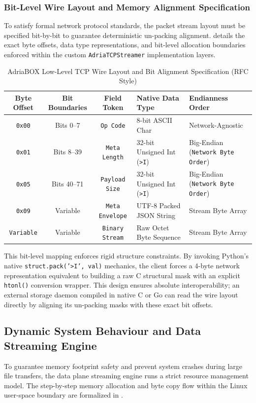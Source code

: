 \subsubsection{Bit-Level Wire Layout and Memory Alignment Specification}
To satisfy formal network protocol standards, the packet stream layout must be specified bit-by-bit to guarantee deterministic un-packing alignment.  details the exact byte offsets, data type representations, and bit-level allocation boundaries enforced within the custom \texttt{AdriaTCPStreamer} implementation layers.

\begin{table}[htbp]
\small
\centering
\caption{AdriaBOX Low-Level TCP Wire Layout and Bit Alignment Specification (RFC Style)}
\label{tab:rfc_wire_format}
\vspace{2mm}
\begin{tabularx}{\textwidth}{|c|c|c|l|X|}
\hline
\textbf{Byte Offset} & \textbf{Bit Boundaries} & \textbf{Field Token} & \textbf{Native Data Type} & \textbf{Endianness Order} \\ \hline
\texttt{0x00} & Bits 0--7 & \texttt{Op Code} & 8-bit ASCII Char & Network-Agnostic \\ \hline
\texttt{0x01} & Bits 8--39 & \texttt{Meta Length} & 32-bit Unsigned Int (\texttt{>I}) & Big-Endian (\texttt{Network Byte Order}) \\ \hline
\texttt{0x05} & Bits 40--71 & \texttt{Payload Size} & 32-bit Unsigned Int (\texttt{>I}) & Big-Endian (\texttt{Network Byte Order}) \\ \hline
\texttt{0x09} & Variable & \texttt{Meta Envelope} & UTF-8 Packed JSON String & Stream Byte Array \\ \hline
\texttt{Variable} & Variable & \texttt{Binary Stream} & Raw Octet Byte Sequence & Stream Byte Array \\ \hline
\end{tabularx}
\end{table}

This bit-level mapping enforces rigid structure constraints. By invoking Python's native \texttt{struct.pack('>I', val)} mechanics, the client forces a 4-byte network representation equivalent to building a raw C structural mask with an explicit \texttt{htonl()} conversion wrapper. This design ensures absolute interoperability; an external storage daemon compiled in native C or Go can read the wire layout directly by aligning its un-packing masks with these exact bit offsets.

\subsection{Dynamic System Behaviour and Data Streaming Engine}
To guarantee memory footprint safety and prevent system crashes during large file transfers, the data plane streaming engine runs a strict resource management model. The step-by-step memory allocation and byte copy flow within the Linux user-space boundary are formalized in .

